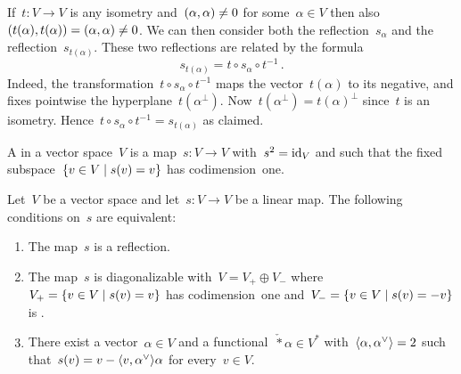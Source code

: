 \begin{recall}
\begin{enumerate}
      If~$t \colon V \to V$ is any isometry and~$(\alpha, \alpha) \neq 0$ for some~$\alpha \in V$ then also~$(t(\alpha), t(\alpha)) = (\alpha, \alpha) \neq 0$.
      We can then consider both the reflection~$s_\alpha$ and the reflection~$s_{t(\alpha)}$.
      These two reflections are related by the formula
      \[
        s_{t(\alpha)}
        =
        t \circ s_{\alpha} \circ t^{-1} \,.
      \]
      Indeed, the transformation~$t \circ s_{\alpha} \circ t^{-1}$ maps the vector~$t(\alpha)$ to its negative, and fixes pointwise the hyperplane~$t(\alpha^\perp)$.
      Now~$t(\alpha^\perp) = t(\alpha)^\perp$ since~$t$ is an isometry.
      Hence~$t \circ s_{\alpha} \circ t^{-1}  = s_{t(\alpha)}$ as claimed.
  \end{enumerate}
\end{recall}


\begin{definition}
  A  in a vector space~$V$ is a map~$s \colon V \to V$ with~$s^2 = \operatorname{id}_V$ and such that the fixed subspace~$\{v \in V \suchthat s(v) = v\}$ has codimension~one.
\end{definition}


\begin{lemma}
  Let~$V$ be a vector space and let~$s \colon V \to V$ be a linear map.
  The following conditions on~$s$ are equivalent:
  \begin{enumerate}
    \item
      \label{is a reflection}
      The map~$s$ is a reflection.
    \item
      \label{is suitable diagonalizable}
      The map~$s$ is diagonalizable with~$V = V_+ \oplus V_-$ where~$V_+ = \{v \in V \suchthat s(v) = v\}$ has codimension~one and~$V_- = \{v \in V \suchthat s(v) = -v\}$ is {\onedimensional}.
    \item
      \label{existence of dual check}
      There exist a vector~$\alpha \in V$ and a functional~$\check*{\alpha} \in V^*$ with~$\pair{\alpha, \check{\alpha}} = 2$ such that~$s(v) = v - \pair{v, \check{\alpha}} \alpha$ for every~$v \in V$.
  \end{enumerate}
\end{lemma}


